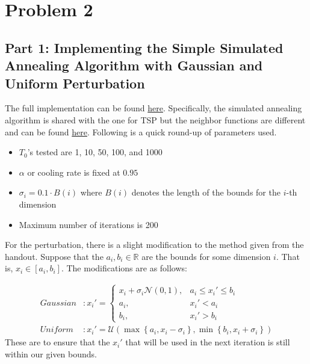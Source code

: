 \section*{Problem 2}

\subsection*{Part 1: Implementing the Simple Simulated Annealing Algorithm with Gaussian and Uniform Perturbation}

The full implementation can be found \href{https://github.com/nngerncham/ma395_heuristic/tree/main/homework/hw2/code/simulated_annealing}{here}. Specifically, the simulated annealing algorithm is shared with the one for TSP but the neighbor functions are different and can be found \href{https://github.com/nngerncham/ma395_heuristic/blob/main/homework/hw2/code/simulated_annealing/cont_neighbors.py}{here}. Following is a quick round-up of parameters used.
\begin{itemize}
    \item \(T_0\)'s tested are 1, 10, 50, 100, and 1000
    \item \(\alpha\) or cooling rate is fixed at \(0.95\)
    \item \(\sigma_i = 0.1 \cdot B(i)\) where \(B(i)\) denotes the length of the bounds for the \(i\)-th dimension
    \item Maximum number of iterations is 200
\end{itemize}

For the perturbation, there is a slight modification to the method given from the handout. Suppose that the \(a_i, b_i \in \mathbb{R}\) are the bounds for some dimension \(i\). That is, \(x_i \in [a_i, b_i]\). The modifications are as follows:

\[
\begin{aligned}
    \textit{Gaussian} &:
        x_i' = \begin{cases}
            x_i + \sigma_i\mathcal{N}(0, 1), & a_i \leq x_i' \leq b_i \\
            a_i, & x_i' < a_i \\
            b_i, & x_i' > b_i
        \end{cases} \\
    \textit{Uniform} &:
        x_i' = \mathcal{U}\left(\max\left\{a_i, x_i-\sigma_i\right\}, \min\left\{b_i, x_i+\sigma_i\right\}\right)
\end{aligned}
\]
These are to ensure that the \(x_i'\) that will be used in the next iteration is still within our given bounds.

